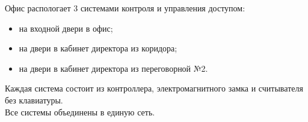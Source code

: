 \documentclass[a4paper,14pt]{extarticle}
\begin{document}
    \begin{spacing}{1.25}
        Офис распологает 3 системами контроля и управления доступом:
        \vspace{-1ex}
        \begin{spacing}{0.5}
            \begin{itemize}
                \item на входной двери в офис;
                \item на двери в кабинет директора из коридора;
                \item на двери в кабинет директора из переговорной №2.
            \end{itemize}
        \end{spacing}
        Каждая система состоит из контроллера, электромагнитного замка и считывателя без клавиатуры.\\ 
        Все системы объединены в единую сеть.
    \end{spacing}



 
    


    
    
\end{document}
